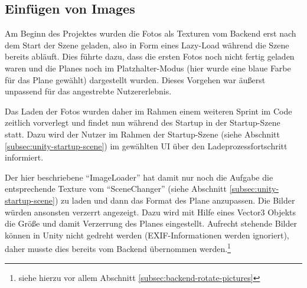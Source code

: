\subsection{Einfügen von Images}
\label{subsec:unity-image-loader}

Am Beginn des Projektes wurden die Fotos als Texturen vom Backend erst nach dem Start der Szene geladen, also in Form eines Lazy-Load während die Szene bereits abläuft. Dies führte dazu, dass die ersten Fotos noch nicht fertig geladen waren und die Planes noch im Platzhalter-Modus (hier wurde eine blaue Farbe für das Plane gewählt) dargestellt wurden. Dieses Vorgehen war äußerst unpassend für das angestrebte Nutzererlebnis. 

Das Laden der Fotos wurden daher im Rahmen einem weiteren Sprint im Code zeitlich vorverlegt und findet nun während des Startup in der Startup-Szene statt. Dazu wird der Nutzer im Rahmen der Startup-Szene (siehe Abschnitt \ref{subsec:unity-startup-scene}) im gewählten UI über den Ladeprozessfortschritt informiert.

Der hier beschriebene ``ImageLoader'' hat damit nur noch die Aufgabe die entsprechende Texture vom ``SceneChanger'' (siehe Abschnitt \ref{subsec:unity-startup-scene}) zu laden und dann das Format des Plane anzupassen. Die Bilder würden ansonsten verzerrt angezeigt. Dazu wird mit Hilfe eines Vector3 Objekts die Größe und damit Verzerrung des Planes eingestellt. Aufrecht stehende Bilder können in Unity nicht gedreht werden (EXIF-Informationen werden ignoriert), daher musste dies bereits vom Backend übernommen werden.\footnote{siehe hierzu vor allem Abschnitt \ref{subsec:backend-rotate-pictures}} 


